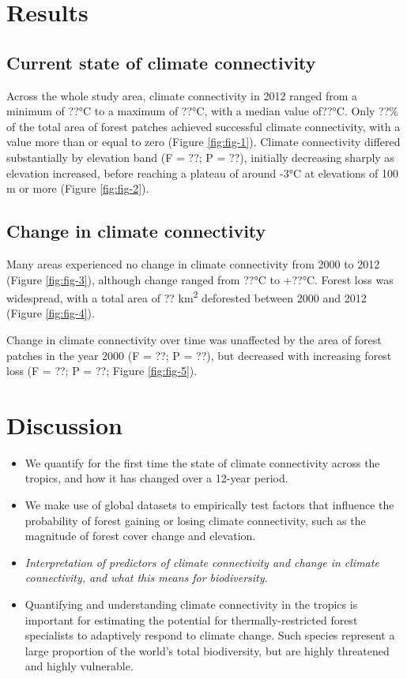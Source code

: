 \documentclass[12pt,a4paper,]{report}
\providecommand{\tightlist}{%
  \setlength{\itemsep}{0pt}\setlength{\parskip}{0pt}}
\theoremstyle{definition}
\theoremstyle{definition}
\theoremstyle{definition}
\theoremstyle{remark}
\begin{document}
\section{Results}\label{results-3}

\subsection{Current state of climate
connectivity}\label{current-state-of-climate-connectivity}

Across the whole study area, climate connectivity in 2012 ranged from a
minimum of ??°C to a maximum of ??°C, with a median value of??°C. Only
??\% of the total area of forest patches achieved successful climate
connectivity, with a value more than or equal to zero (Figure
\ref{fig:fig-1}). Climate connectivity differed substantially by
elevation band (F = ??; P = ??), initially decreasing sharply as
elevation increased, before reaching a plateau of around -3°C at
elevations of 100 m or more (Figure \ref{fig:fig-2}).

\subsection{Change in climate
connectivity}\label{change-in-climate-connectivity}

Many areas experienced no change in climate connectivity from 2000 to
2012 (Figure \ref{fig:fig-3}), although change ranged from ??°C to
+??°C. Forest loss was widespread, with a total area of ??
km\textsuperscript{2} deforested between 2000 and 2012 (Figure
\ref{fig:fig-4}).

Change in climate connectivity over time was unaffected by the area of
forest patches in the year 2000 (F = ??; P = ??), but decreased with
increasing forest loss (F = ??; P = ??; Figure \ref{fig:fig-5}).

\section{Discussion}\label{discussion-3}

\begin{itemize}
\tightlist
\item
  We quantify for the first time the state of climate connectivity
  across the tropics, and how it has changed over a 12-year period.
\item
  We make use of global datasets to empirically test factors that
  influence the probability of forest gaining or losing climate
  connectivity, such as the magnitude of forest cover change and
  elevation.
\item
  \emph{Interpretation of predictors of climate connectivity and change
  in climate connectivity, and what this means for biodiversity.}
\item
  Quantifying and understanding climate connectivity in the tropics is
  important for estimating the potential for thermally-restricted forest
  specialists to adaptively respond to climate change. Such species
  represent a large proportion of the world's total biodiversity, but
  are highly threatened and highly vulnerable.
\end{itemize}
\end{document}
